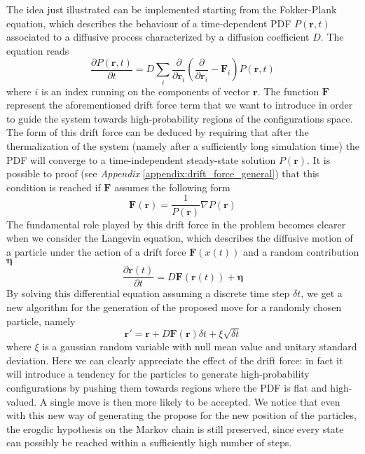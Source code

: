 The idea just illustrated can be implemented starting from the Fokker-Plank equation, which describes the behaviour of a time-dependent PDF $P(\bm{r}, t)$ associated to a diffusive process characterized by a diffusion coefficient $D$. The equation reads
\begin{equation*}
    \frac{\partial P(\bm{r}, t)}{\partial t} = D \sum_i \frac{\partial}{\partial \bm{r}_i} \left( \frac{\partial}{\partial \bm{r}_i} - \bm{F}_i \right) P(\bm{r}, t)
\end{equation*}
where $i$ is an index running on the components of vector $\bm{r}$. The function $\bm{F}$ represent the aforementioned drift force term that we want to introduce in order to guide the system towards high-probability regions of the configurations space. The form of this drift force can be deduced by requiring that after the thermalization of the system (namely after a sufficiently long simulation time) the PDF will converge to a time-independent steady-state solution $P(\bm{r})$. It is possible to proof (see \textit{Appendix} \ref{appendix:drift_force_general}) that this condition is reached if $\bm{F}$ assumes the following form
\begin{equation*}
    \bm{F}(\bm{r}) = \frac{1}{P(\bm{r})} \nabla P(\bm{r})
\end{equation*}
The fundamental role played by this drift force in the problem becomes clearer when we consider the Langevin equation, which describes the diffusive motion of a particle under the action of a drift force $\bm{F}(x(t))$ and a random contribution $\bm{\eta}$ 
\begin{equation*}
    \frac{\partial \bm{r}(t)}{\partial t} = D \bm{F}(\bm{r}(t)) + \bm{\eta}  
\end{equation*}
By solving this differential equation assuming a discrete time step $\delta t$, we get a new algorithm for the generation of the proposed move for a randomly chosen particle, namely
\begin{equation*}
    \bm{r}' = \bm{r} + D \bm{F}(\bm{r}) \delta t + \xi \sqrt{\delta t}
\end{equation*}
where $\xi$ is a gaussian random variable with null mean value and unitary standard deviation. Here we can clearly appreciate the effect of the drift force: in fact it will introduce a tendency for the particles to generate high-probability configurations by pushing them towards regions where the PDF is flat and high-valued. A single move is then more likely to be accepted. We notice that even with this new way of generating the propose for the new position of the particles, the erogdic hypothesis on the Markov chain is still preserved, since every state can possibly be reached within a sufficiently high number of steps. 

